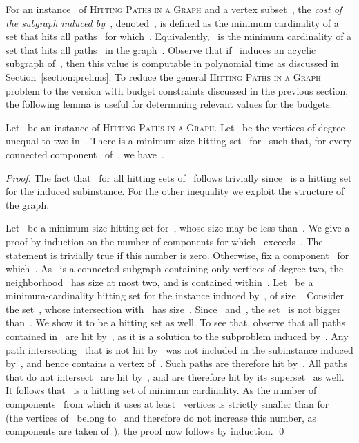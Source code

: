 \let\accentvec\vec  \documentclass{llncs}
\newcommand{\HitPathsInGraph}{\textsc{Hitting Paths in a Graph}\xspace}
\begin{document}
For an instance~ of \HitPathsInGraph and a vertex subset~, the \emph{cost of the subgraph induced by~}, denoted~, is defined as the minimum cardinality of a set that hits all paths~ for which~. Equivalently,~ is the minimum cardinality of a set that hits all paths~ in the graph~. Observe that if~ induces an acyclic subgraph of~, then this value is computable in polynomial time as discussed in Section~\ref{section:prelims}. To reduce the general \HitPathsInGraph problem to the version with budget constraints discussed in the previous section, the following lemma is useful for determining relevant values for the budgets.

\begin{lemma} \label{lemma:budget:on:paths}
Let~ be an instance of \HitPathsInGraph. Let~ be the vertices of degree unequal to two in~. There is a minimum-size hitting set~ for~ such that, for every connected component~ of~, we have~.
\end{lemma}
\begin{proof}
The fact that~ for all hitting sets of~ follows trivially since~ is a hitting set for the induced subinstance. For the other inequality we exploit the structure of the graph.

Let~ be a minimum-size hitting set for~, whose size may be less than~. We give a proof by induction on the number of components for which~ exceeds~. The statement is trivially true if this number is zero. Otherwise, fix a component~ for which~. As~ is a connected subgraph containing only vertices of degree two, the neighborhood~ has size at most two, and is contained within~. Let~ be a minimum-cardinality hitting set for the instance induced by~, of size~. Consider the set~, whose intersection with~ has size~. Since~ and~, the set~ is not bigger than~. We show it to be a hitting set as well. To see that, observe that all paths contained in~ are hit by~, as it is a solution to the subproblem induced by~. Any path intersecting~ that is not hit by~ was not included in the subinstance induced by~, and hence contains a vertex of~. Such paths are therefore hit by~. All paths that do not intersect~ are hit by~, and are therefore hit by its superset~ as well. It follows that~ is a hitting set of minimum cardinality. As the number of components~ from which it uses at least~ vertices is strictly smaller than for~ (the vertices of~ belong to~ and therefore do not increase this number, as components are taken of~), the proof now follows by induction.
\qed
\end{proof}
\end{document}

